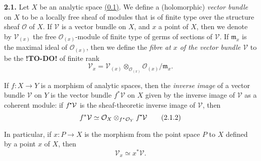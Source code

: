 \documentclass{report}
\newenvironment{rmenv}[1]
  {\phantomsection\par\medskip\noindent\textbf{#1.}\rmfamily}
  {\par\medskip}
\renewcommand{\cal}[1]{{\mathcal{#1}}}
\newcommand{\sbullet}{{\mathbin{\vcenter{\hbox{\scalebox{.5}{$\bullet$}}}}}}
\newcommand{\todo}{\textbf{ !TO-DO! }}
\newcommand{\oldpage}[1]{\marginpar{\footnotesize$\Big\vert$ \textit{p.~#1}}}
\begin{document}
\oldpage{5}

\begin{rmenv}{2.1}
  Let $X$ be an analytic space \hyperref[0.1]{(0.1)}.
  We define a (holomorphic) \emph{vector bundle} on $X$ to be a locally free sheaf of modules that is of finite type over the structure sheaf $\cal{O}$ of $X$.
  If $\cal{V}$ is a vector bundle on $X$, and $x$ a point of $X$, then we denote by $\cal{V}_{(x)}$ the free $\cal{O}_{(x)}$-module of finite type of germs of sections of $\cal{V}$.
  If $\mathfrak{m}_x$ is the maximal ideal of $\cal{O}_{(x)}$, then we define the \emph{fibre at $x$ of the vector bundle $\cal{V}$} to be the \todo of finite rank
  \[
  \label{I.2.1.1}
    \cal{V}_x = \cal{V}_{(x)} \otimes_{\cal{O}_{(x)}} \cal{O}_{(x)}/\mathfrak{m}_x.
  \tag{2.1.1}
  \]

  If $f\colon X\to Y$ is a morphism of analytic spaces, then the \emph{inverse image} of a vector bundle $\cal{V}$ on $Y$ is the vector bundle $f^*\cal{V}$ on $X$ given by the inverse image of $\cal{V}$ as a coherent module:
  if $f^\sbullet\cal{V}$ is the sheaf-theoretic inverse image of $\cal{V}$, then
  \[
  \label{I.2.1.2}
    f^*\cal{V} \simeq \cal{O}_X \otimes_{f^*\cal{O}_Y} f^\sbullet\cal{V}
  \tag{2.1.2}
  \]

  In particular, if $x\colon P\to X$ is the morphism from the point space $P$ to $X$ defined by a point $x$ of $X$, then
  \[
    \label{I.2.1.3}
      \cal{V}_x \simeq x^*\cal{V}.
    \tag{2.1.3}
  \]
\end{rmenv}
\end{document}
